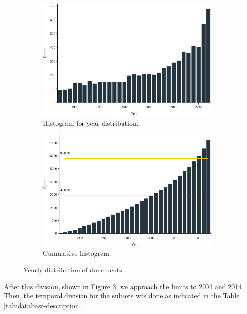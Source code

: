\begin{figure}[h!]
	\begin{subfigure}{0.45\textwidth}
		\includegraphics[width=\linewidth]{01.Chapters/04.Materials/yearly-histogram}
		\caption{Histogram for year distribution.} \label{fig:yearly-histogram}
	\end{subfigure}%
	\hfill
	\begin{subfigure}{0.45\textwidth}
		\includegraphics[width=\linewidth]{01.Chapters/04.Materials/yearly-cumulative}
		\caption{Cumulative histogram.} \label{fig:yearly-cumulative}
	\end{subfigure}%
	\caption{Yearly distribution of documents.} 
	\label{fig:yearly-distribution}
\end{figure}

After this division, shown in Figure \ref{fig:yearly-distribution}, we approach the limits to 2004 and 2014. Then, the temporal division for the subsets was done as indicated in the Table \ref{tab:database-description}.

